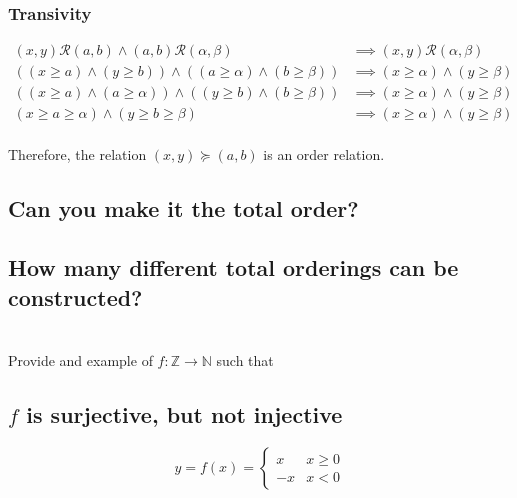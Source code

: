 \documentclass[]{article}
\newcommand{\Rel}{\mathcal{R}}
\newcommand{\N}{\mathbb{N}}
\newcommand{\Z}{\mathbb{Z}}
\begin{document}
\subsubsection{Transivity}
\begin{align*}
	(x,y) \Rel (a,b) \land (a,b) \Rel (\alpha,\beta) 
		&\implies (x,y) \Rel (\alpha,\beta)\\
	((x \geq a) \land (y \geq b)) \land ((a \geq \alpha) \land (b \geq \beta))
		&\implies (x \geq \alpha) \land (y \geq \beta)\\
	((x \geq a) \land (a \geq \alpha)) \land ((y \geq b) \land (b \geq \beta))
		&\implies (x \geq \alpha) \land (y \geq \beta)\\
	(x \geq a \geq \alpha) \land (y \geq b \geq \beta)
		&\implies (x \geq \alpha) \land (y \geq \beta)\\
\end{align*}

Therefore, the relation $(x,y) \succeq (a,b)$ is an order relation.

\subsection{Can you make it the total order?}



\subsection{How many different total orderings can be constructed?}




\newpage
\section{}
Provide and example of $f : \Z \to \N$ such that

\subsection{$f$ is surjective, but not injective}

\begin{displaymath}
	y = f(x) =
	\begin{cases}
		x & x \geq 0\\
		-x & x < 0
	\end{cases}
\end{displaymath}
\end{document}
